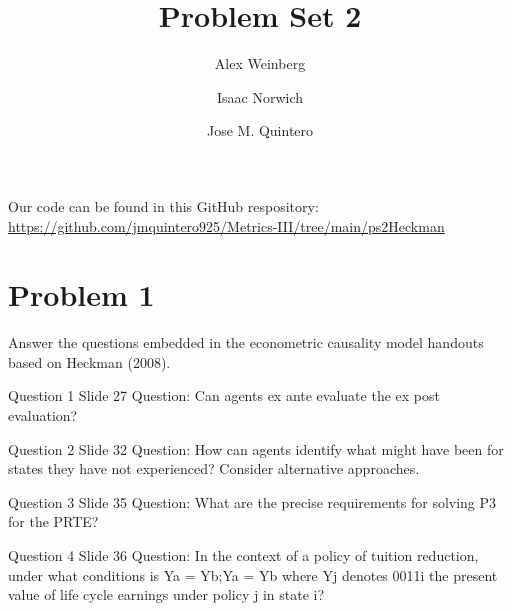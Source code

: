 \documentclass{article}
\title{Problem Set 2}
\author{Alex Weinberg \and Isaac Norwich \and Jose M. Quintero}
\begin{document}
\maketitle

\begin{comment}
Q3 - 3 parts - no solutions - Jose
Q4 - 1 part  - no solutions - Alex
Q5 - 1 part  - no solutions - Jose
Q8 - 5 parts - no solutions - Isaac

Q1 - 7 parts - solutions - Isaac & Jose
Q2 - 4 parts - solutions - Jose
Q6 - 1 part  - solutions - Alex
Q7 - 3 parts - solutions - Alex

Parts:
Isaac - 5
Alex
Jose

Total of 21 parts and 2 other questions

\end{comment}


Our code can be found in this GitHub respository: \url{https://github.com/jmquintero925/Metrics-III/tree/main/ps2Heckman}


\section*{Problem 1}
Answer the questions embedded in the econometric causality model handouts based on Heckman (2008).

\begin{problem}{Question 1 Slide 27}
Question: Can agents ex ante evaluate the ex post evaluation?
\end{problem}
\begin{solution}
\end{solution}


\begin{problem}{Question 2 Slide 32}
Question: How can agents identify what might have been for states they have not experienced? Consider alternative approaches.
\end{problem}
\begin{solution}
\end{solution}
 
\begin{problem}{Question 3 Slide 35}
Question: What are the precise requirements for solving P3 for the PRTE?
\end{problem}
\begin{solution}
\end{solution}
 
 
\begin{problem}{Question 4 Slide 36}
Question: In the context of a policy of tuition reduction,
under what conditions is Ya = Yb;Ya = Yb where Yj denotes 0011i
the present value of life cycle earnings under policy j in state i?
\end{problem}
\begin{solution}
\end{solution}
\end{document}
